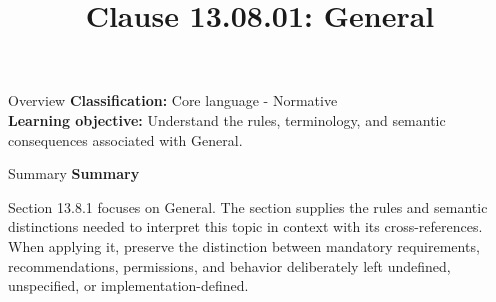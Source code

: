 \documentclass[10pt,letterpaper]{article}
\title{Clause 13.08.01: General}
\author{}
\date{}
\begin{document}
\maketitle
\begin{CornellOverviewBox}{Overview}
\textbf{Classification:} Core language - Normative\\[2pt]
\textbf{Learning objective:} Understand the rules, terminology, and semantic consequences associated with General.
\end{CornellOverviewBox}\begin{CornellSummaryBox}{Summary}
{\sffamily\bfseries\color{Accent} Summary}\par\vspace{3pt}Section 13.8.1 focuses on General. The section supplies the rules and semantic distinctions needed to interpret this topic in context with its cross-references. When applying it, preserve the distinction between mandatory requirements, recommendations, permissions, and behavior deliberately left undefined, unspecified, or implementation-defined.
\end{CornellSummaryBox}
\end{document}
